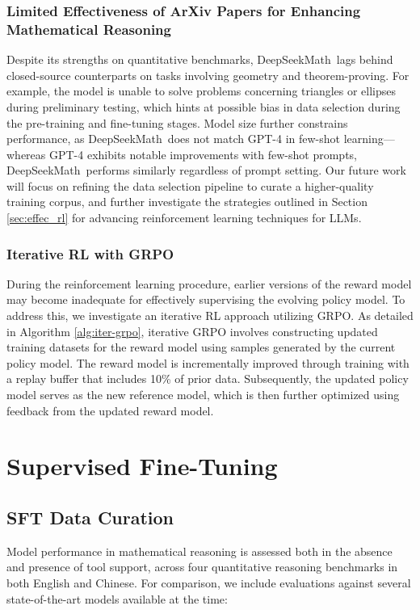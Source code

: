 {\subsubsection{Limited Effectiveness of ArXiv Papers for Enhancing Mathematical Reasoning}

Despite its strengths on quantitative benchmarks, DeepSeekMath~lags behind closed-source counterparts on tasks involving geometry and theorem-proving. For example, the model is unable to solve problems concerning triangles or ellipses during preliminary testing, which hints at possible bias in data selection during the pre-training and fine-tuning stages. Model size further constrains performance, as DeepSeekMath~does not match GPT-4 in few-shot learning—whereas GPT-4 exhibits notable improvements with few-shot prompts, DeepSeekMath~performs similarly regardless of prompt setting. Our future work will focus on refining the data selection pipeline to curate a higher-quality training corpus, and further investigate the strategies outlined in Section \ref{sec:effec_rl} for advancing reinforcement learning techniques for LLMs.

\subsubsection{Iterative RL with GRPO} During the reinforcement learning procedure, earlier versions of the reward model may become inadequate for effectively supervising the evolving policy model. To address this, we investigate an iterative RL approach utilizing GRPO. As detailed in Algorithm \ref{alg:iter-grpo}, iterative GRPO involves constructing updated training datasets for the reward model using samples generated by the current policy model. The reward model is incrementally improved through training with a replay buffer that includes 10\% of prior data. Subsequently, the updated policy model serves as the new reference model, which is then further optimized using feedback from the updated reward model.

\section{Supervised Fine-Tuning}

\subsection{SFT Data Curation}

Model performance in mathematical reasoning is assessed both in the absence and presence of tool support, across four quantitative reasoning benchmarks in both English and Chinese. For comparison, we include evaluations against several state-of-the-art models available at the time:

}

